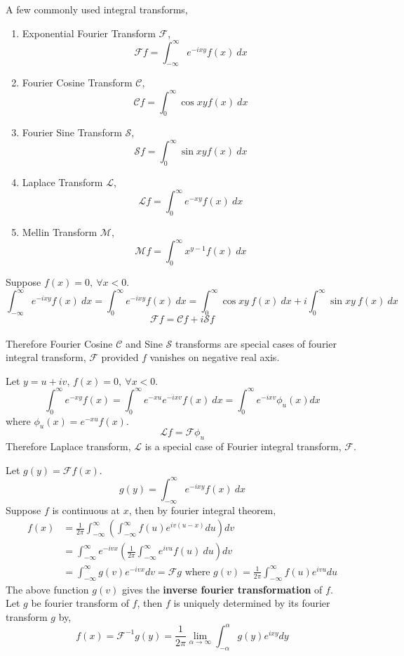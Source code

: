 \begin{remark} A few commonly used integral transforms,
\begin{enumerate}
	\item Exponential Fourier Transform $\mathscr{F}$,
		$$\mathscr{F}f = \int_{-\infty}^\infty e^{-ixy}f(x)\ dx$$
	\item Fourier Cosine Transform $\mathscr{C}$,
		$$\mathscr{C}f = \int_0^\infty \cos xy f(x)\ dx$$
	\item Fourier Sine Transform $\mathscr{S}$,
		$$\mathscr{S}f = \int_0^\infty \sin xy f(x)\ dx$$
	\item Laplace Transform $\mathscr{L}$,
		$$\mathscr{L}f = \int_0^\infty e^{-xy} f(x)\ dx$$
	\item Mellin Transform $\mathscr{M}$,
		$$\mathscr{M}f = \int_0^\infty x^{y-1}f(x)\ dx$$
\end{enumerate}
\end{remark}

\begin{remark} Suppose $f(x) = 0,\ \forall x < 0$.
	$$\int_{-\infty}^\infty e^{-ixy}f(x)\ dx = \int_0^\infty e^{-ixy}f(x)\ dx = \int_0^\infty \cos xy \ f(x)\ dx + i \int_0^\infty \sin xy \ f(x)\ dx$$
	$$\mathscr{F}f = \mathscr{C}f + i\mathscr{S}f$$\\
	Therefore Fourier Cosine $\mathscr{C}$ and Sine $\mathscr{S}$ transforms are special cases of fourier integral transform, $\mathscr{F}$ provided $f$ vanishes on negative real axis.
\end{remark}

\begin{remark} Let $y = u+iv$, $f(x) = 0,\ \forall x < 0$.
	$$\int_0^\infty e^{-xy}f(x) = \int_0^\infty e^{-xu}e^{-ixv}f(x)\ dx = \int_0^\infty e^{-ixv} \phi_u(x) dx$$
	where $\phi_u(x) = e^{-xu}f(x)$.
	$$\mathscr{L}f = \mathscr{F}\phi_u$$
	Therefore Laplace transform, $\mathscr{L}$ is a special case of Fourier integral transform, $\mathscr{F}$.
\end{remark}

\begin{remark} Let $g(y) = \mathscr{F}f(x)$.
	$$g(y) = \int_{-\infty}^\infty e^{-ixy}f(x)\ dx$$
	Suppose $f$ is continuous at $x$, then by fourier integral theorem,
	\begin{align*}
		f(x)	& = \frac{1}{2\pi} \int_{-\infty}^\infty \left( \int_{-\infty}^\infty f(u) e^{iv(u-x)} du \right) dv\\
			& = \int_{-\infty}^\infty e^{-ivx} \left( \frac{1}{2\pi} \int_{-\infty}^\infty e^{ivu} f(u)\ du \right) dv\\
			& = \int_{-\infty}^\infty g(v) e^{-ivx} dv = \mathscr{F}g \text{ where } g(v) = \frac{1}{2\pi}\int_{-\infty}^\infty f(u) e^{ivu} du 
	\end{align*}
	The above function $g(v)$ gives the \textbf{inverse fourier transformation} of $f$.\\

	Let $g$ be fourier transform of $f$, then $f$ is uniquely determined by its fourier transform $g$ by,
	$$f(x) = \mathscr{F}^{-1}g(y) = \frac{1}{2\pi} \lim_{\alpha \to \infty} \int_{-\alpha}^\alpha g(y) e^{ixy} dy$$
\end{remark}

